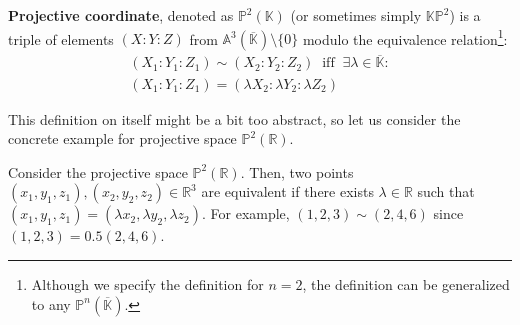 \documentclass[../lecture-notes.tex]{subfiles}
\begin{document}

\vspace{-1mm}

\begin{definition}
    \textbf{Projective coordinate}, denoted as $\mathbb{P}^2(\mathbb{K})$ (or sometimes simply $\mathbb{K}\mathbb{P}^2$) is a triple of elements $(X:Y:Z)$ from $\mathbb{A}^3(\overline{\mathbb{K}}) \setminus \{0\}$ modulo the equivalence relation\footnote{Although we specify the definition for $n=2$, the definition can be generalized to any $\mathbb{P}^n(\overline{\mathbb{K}})$.}:
    \begin{equation*}
        \begin{aligned}
            (X_1:Y_1:Z_1) \sim (X_2:Y_2:Z_2) \;\; \text{iff} \;\; \exists \lambda \in \overline{\mathbb{K}}: \\
            (X_1:Y_1:Z_1) = (\lambda X_2: \lambda Y_2: \lambda Z_2)            
        \end{aligned}
    \end{equation*}
\end{definition}

\vspace{-1mm}

This definition on itself might be a bit too abstract, so let us consider the concrete example for projective space $\mathbb{P}^2(\mathbb{R})$.

\vspace{-1mm}

\begin{example}
    Consider the projective space $\mathbb{P}^2(\mathbb{R})$. Then, two points $(x_1,y_1,z_1),(x_2,y_2,z_2) \in \mathbb{R}^3$ are equivalent if there exists $\lambda \in \mathbb{R}$ such that $(x_1,y_1,z_1) = (\lambda x_2, \lambda y_2, \lambda z_2)$. For example, $(1,2,3) \sim (2,4,6)$ since $(1,2,3) = 0.5(2,4,6)$.
\end{example}
\end{document}

